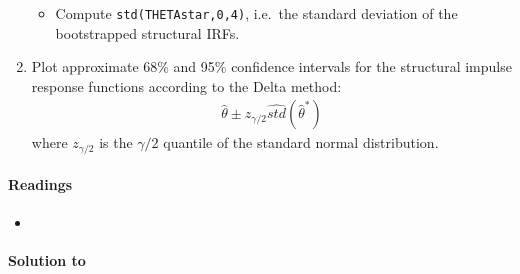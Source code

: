 \begin{enumerate}
\begin{itemize}
\item Compute \texttt{std(THETAstar,0,4)}, i.e.\ the standard deviation of the bootstrapped structural IRFs.

\end{itemize}

\item Plot approximate 68\% and 95\% confidence intervals for the structural impulse response functions according to the Delta method:
\begin{align*}
\hat{\theta} \pm z_{\gamma/2} \widehat{std}(\hat{\theta}^{\ast})
\end{align*}
  where \(z_{\gamma/2}\) is the \(\gamma/2\) quantile of the standard normal distribution.

\end{enumerate}

\paragraph{Readings}
\begin{itemize}
\item \textcite[Ch.~12.1-12.5, 12.9]{Kilian.Lutkepohl_2017_StructuralVectorAutoregressive}
\end{itemize}

\begin{solution}\textbf{Solution to }
\ifDisplaySolutions%

\fi
\newpage
\end{solution}